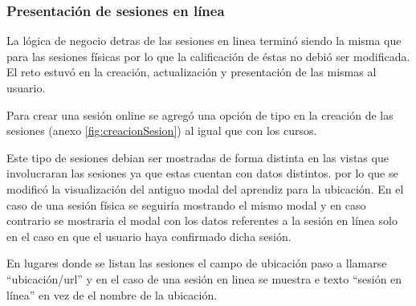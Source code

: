\subsubsection{Presentación de sesiones en línea }

La lógica de negocio detras de las sesiones en linea terminó siendo la misma que para las sesiones físicas por lo que la calificación de éstas no debió ser modificada. El reto estuvó en la creación, actualización y presentación de las mismas al usuario.

Para crear una sesión online se agregó una opción de tipo en la creación de las sesiones (anexo \ref{fig:creacionSesion}) al igual que con los cursos.

Este tipo de sesiones debian ser mostradas de forma distinta en las vistas que involucraran las sesiones ya que estas cuentan con datos distintos. por lo que se modificó la visualización del antiguo modal del aprendiz para la ubicación. En el caso de una sesión física se seguiría mostrando el mismo modal y en caso contrario se mostraria el modal con los datos referentes a la sesión en línea solo en el caso en que el usuario haya confirmado dicha sesión.

En lugares donde se listan las sesiones el campo de ubicación paso a llamarse ``ubicación/url'' y en el caso de una sesión en linea se muestra e texto ``sesión en línea'' en vez de el nombre de la ubicación. 

